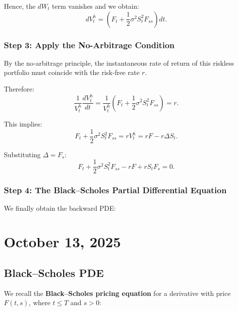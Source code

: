 \documentclass[12pt,a4paper]{article}
\theoremstyle{definition}
\begin{document}
Hence, the $dW_t$ term vanishes and we obtain:
\[
dV_t^h = \left(F_t + \frac{1}{2}\sigma^2 S_t^2 F_{ss}\right) dt.
\]

\subsubsection*{Step 3: Apply the No-Arbitrage Condition}
By the no-arbitrage principle, the instantaneous rate of return of this riskless portfolio must coincide with the risk-free rate $r$.

Therefore:
\[
\frac{1}{V_t^h} \frac{dV_t^h}{dt} = \frac{1}{V_t^h} \left(F_t + \frac{1}{2}\sigma^2 S_t^2 F_{ss}\right) = r.
\]

This implies:
\[
F_t + \frac{1}{2}\sigma^2 S_t^2 F_{ss} = r V_t^h = r F - r \Delta S_t.
\]

Substituting $\Delta = F_s$:
\[
F_t + \frac{1}{2}\sigma^2 S_t^2 F_{ss} - r F + r S_t F_s = 0.
\]

\subsubsection*{Step 4: The Black--Scholes Partial Differential Equation}
We finally obtain the backward PDE:

\begin{center}
\end{center}

\newpage
\section{October 13, 2025}

\subsection{Black--Scholes PDE}

We recall the \textbf{Black--Scholes pricing equation} for a derivative with price $F(t,s)$, where $t \le T$ and $s>0$:

\begin{center}
\end{center}
\end{document}

